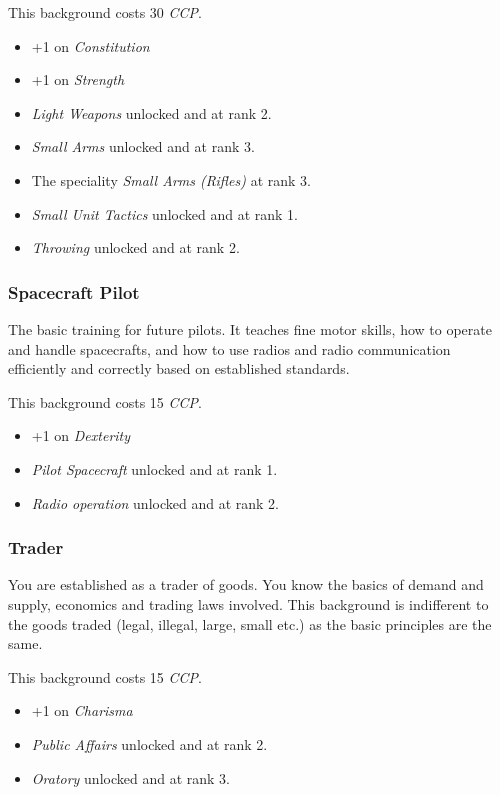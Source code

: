 This background costs 30 \emph{CCP}.

\begin{itemize}
\item +1 on \emph{Constitution}
\item +1 on \emph{Strength}
\item \emph{Light Weapons} unlocked and at rank 2.
\item \emph{Small Arms} unlocked and at rank 3.
\item The speciality \emph{Small Arms (Rifles)} at rank 3.
\item \emph{Small Unit Tactics} unlocked and at rank 1.
\item \emph{Throwing} unlocked and at rank 2.
\end{itemize}

\subsubsection{Spacecraft Pilot}

The basic training for future pilots. It teaches fine motor skills, how to
operate and handle spacecrafts, and how to use radios and radio communication
efficiently and correctly based on established standards.

This background costs 15 \emph{CCP}.

\begin{itemize}
\item +1 on \emph{Dexterity}
\item \emph{Pilot Spacecraft} unlocked and at rank 1.
\item \emph{Radio operation} unlocked and at rank 2.
\end{itemize}

\subsubsection{Trader}

You are established as a trader of goods. You know the basics of demand and
supply, economics and trading laws involved. This background is indifferent
to the goods traded (legal, illegal, large, small etc.) as the basic principles
are the same.

This background costs 15 \emph{CCP}.

\begin{itemize}
\item +1 on \emph{Charisma}
\item \emph{Public Affairs} unlocked and at rank 2.
\item \emph{Oratory} unlocked and at rank 3.
\end{itemize}
